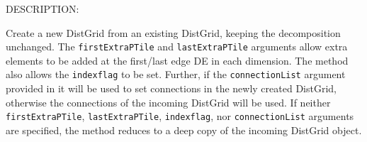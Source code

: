 {\sf DESCRIPTION:\\ }


       Create a new DistGrid from an existing DistGrid, keeping the decomposition
       unchanged. The {\tt firstExtraPTile} and {\tt lastExtraPTile} arguments allow extra
       elements to be added at the first/last edge DE in each dimension. The 
       method also allows the {\tt indexflag} to be set. Further, if the 
       {\tt connectionList} argument provided in it will be used to set 
       connections in the newly created DistGrid, otherwise the connections of
       the incoming DistGrid will be used.
       If neither {\tt firstExtraPTile}, {\tt lastExtraPTile}, {\tt indexflag}, nor 
       {\tt connectionList} arguments are specified, the method reduces to a 
       deep copy of the incoming DistGrid object.
  
